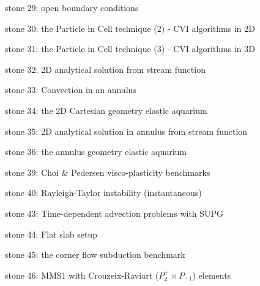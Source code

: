 {\noindent stone 29: open boundary conditions


\noindent stone 30: the Particle in Cell technique (2) - CVI algorithms in 2D


\noindent stone 31: the Particle in Cell technique (3) - CVI algorithms in 3D


\noindent stone 32: 2D analytical solution from stream function


\noindent stone 33: Convection in an annulus 


\noindent stone 34: the 2D Cartesian geometry elastic aquarium


\noindent stone 35: 2D analytical solution in annulus from stream function 


\noindent stone 36: the annulus geometry elastic aquarium


\noindent stone 39: Choi \& Pedersen visco-plasticity benchmarks 


\noindent stone 40: Rayleigh-Taylor instability (instantaneous)


\noindent stone 43: Time-dependent advection problems with SUPG


\noindent stone 44: Flat slab setup 


\noindent stone 45: the corner flow subduction benchmark \cite{vack08}  


\noindent stone 46: MMS1 with Crouzeix-Raviart ($P_2^+\times P_{-1}$) elements  


}
